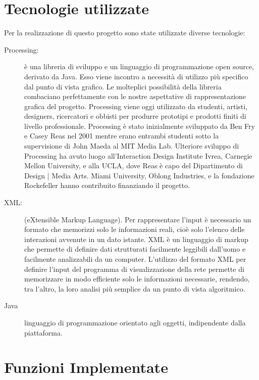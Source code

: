 \documentclass[a4paper,12pt]{article}
\begin{document}
\section{Tecnologie utilizzate}
Per la realizzazione di questo progetto sono state utilizzate diverse tecnologie:
\begin{description}
 \item[Processing:] \`e una libreria di sviluppo e un linguaggio di programmazione open source, derivato da Java. Esso viene incontro a necessità di utilizzo più specifico dal punto di vista grafico. Le molteplici possibilità della libreria combaciano perfettamente con le nostre aspettative di rappresentazione grafica del progetto. Processing viene oggi utilizzato da studenti, artisti, designers, ricercatori e obbisti per produrre prototipi e prodotti finiti di livello professionale. Processing \`e stato inizialmente sviluppato da Ben Fry e Casey Reas nel 2001 mentre erano entrambi studenti sotto la supervisione di John Maeda al MIT Media Lab. Ulteriore sviluppo di Processing ha avuto luogo all'Interaction Design Institute Ivrea, Carnegie Mellon University, e alla UCLA, dove Reas \`e capo del Dipartimento di Design | Media Arts. Miami University, Oblong Industries, e la fondazione Rockefeller hanno contribuito finanziando il progetto.
 \item[XML:] (eXtensible Markup Language). Per rappresentare l'input \`e necessario un formato che memorizzi solo le informazioni reali, cio\`e solo l'elenco delle interazioni avvenute in un dato istante. XML \`e un linguaggio di markup che permette di definire dati strutturati facilmente leggibili dall'uomo e facilmente analizzabili da un computer. L'utilizzo del formato XML per definire l'input del programma di visualizzazione della rete permette di memorizzare in modo efficiente solo le informazioni necessarie, rendendo, tra l'altro, la loro analisi più semplice da un punto di vista algoritmico.
 \item[Java]  linguaggio di programmazione orientato agli oggetti, indipendente dalla piattaforma.
\end{description}
        
\section{Funzioni Implementate}
 
\end{document}
